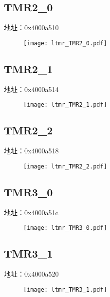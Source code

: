 \subsection{TMR2\_0}
\label{ltmr-TMR2-0}
地址：0x4000a510
 \begin{figure}[H]
\texttt{[image: ltmr\_TMR2\_0.pdf]}
\end{figure}

\subsection{TMR2\_1}
\label{ltmr-TMR2-1}
地址：0x4000a514
 \begin{figure}[H]
\texttt{[image: ltmr\_TMR2\_1.pdf]}
\end{figure}

\subsection{TMR2\_2}
\label{ltmr-TMR2-2}
地址：0x4000a518
 \begin{figure}[H]
\texttt{[image: ltmr\_TMR2\_2.pdf]}
\end{figure}

\subsection{TMR3\_0}
\label{ltmr-TMR3-0}
地址：0x4000a51c
 \begin{figure}[H]
\texttt{[image: ltmr\_TMR3\_0.pdf]}
\end{figure}

\subsection{TMR3\_1}
\label{ltmr-TMR3-1}
地址：0x4000a520
 \begin{figure}[H]
\texttt{[image: ltmr\_TMR3\_1.pdf]}
\end{figure}

